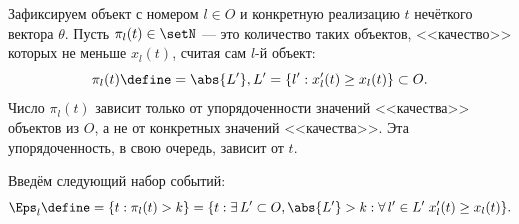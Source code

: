 Зафиксируем объект с номером $l \in O$ и конкретную реализацию  $t$ нечёткого вектора $\theta$. Пусть $\pi_l(t) \in \setN$ --- это количество таких объектов, <<качество>> которых не меньше $x_l(t)$, считая сам $l$-й объект:
\begin{equation*}
  \pi_l(t) \define=  \abs{L'}, L' = \{l': x_l'(t) \geq x_{l}(t)\}  \subset O.
\end{equation*}
 Число $\pi_l(t)$ зависит только от упорядоченности значений <<качества>> объектов из $O$, а не от конкретных значений <<качества>>. Эта упорядоченность, в свою очередь, зависит от $t$. 


Введём следующий набор событий:
\begin{equation}
  \label{e:Eps_l_def}
  \Eps_l \define= \{t: \pi_l(t) > k\} = \{t: \exists\, L' \subset O, \abs{L'} > k: \forall\, l' \in L'\;x_l'(t) \geq x_{l}(t)\}.
\end{equation}


